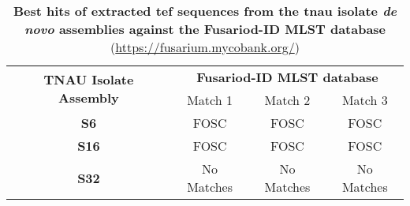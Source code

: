 \begin{table}[]
\centering
\captionsetup{width=\linewidth} 
\caption[\Ac{tnau}\acf{tef} \acf{ncbi} and Fusariod-ID MSLT database searches.]{\textbf{Best hits of extracted \acf{tef} sequences from the \acf{tnau} isolate \textit{de novo} assemblies against the Fusariod-ID MLST database} (\href{https://fusarium.mycobank.org/}{https://fusarium.mycobank.org/})}
\label{tab:Tef1-MLSTdb}
\begin{tabular}{cccc}
\multirow{2}{*}{\textbf{TNAU Isolate Assembly}} & \multicolumn{3}{c}{\textbf{Fusariod-ID MLST database}}                                     \\ \cline{2-4} 
                                                & Match 1                      & Match 2                      & Match 3                      \\ \hline
\textbf{S6}                 & \ac{FOSC}& \ac{FOSC}& \ac{FOSC}\\
\textbf{S16}                                    & \ac{FOSC} & \ac{FOSC} & \ac{FOSC} \\
\textbf{S32}                        & No Matches                   & No Matches                   & No Matches                  
\end{tabular}%
\end{table}

